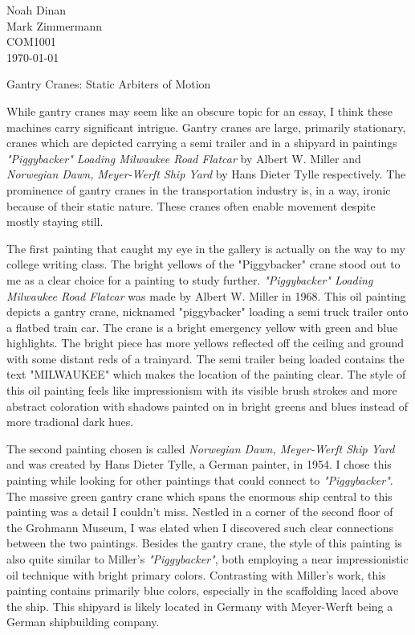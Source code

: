 \documentclass[12pt]{article}
\begin{document}
\noindent
Noah Dinan \\ Mark Zimmermann \\ COM1001 \\ \today \\

\begin{center}
Gantry Cranes: Static Arbiters of Motion
\end{center}

\setlength{\parindent}{0.5in}

While gantry cranes may seem like an obscure topic for an essay, I think these machines carry significant intrigue.
Gantry cranes are large, primarily stationary, cranes which are depicted carrying a semi trailer and in a shipyard
in paintings \textit{"Piggybacker" Loading Milwaukee Road Flatcar} by Albert W. Miller and \textit{Norwegian Dawn, Meyer-Werft Ship Yard} by 
Hans Dieter Tylle respectively. The prominence of gantry cranes in the transportation industry is, in a way, ironic because of their static nature.
These cranes often enable movement despite mostly staying still.

The first painting that caught my eye in the gallery is actually on the way to my college writing class. The bright yellows of the 
"Piggybacker" crane stood out to me as a clear choice for a painting to study further. \textit{"Piggybacker" Loading Milwaukee Road Flatcar}
was made by Albert W. Miller in 1968. This oil painting depicts a gantry crane, nicknamed "piggybacker" loading a semi truck trailer onto
a flatbed train car. The crane is a bright emergency yellow with green and blue highlights. The bright piece has more yellows reflected off the ceiling
and ground with some distant reds of a trainyard. The semi trailer being loaded contains the text "MILWAUKEE" which makes the location
of the painting clear. The style of this oil painting feels like impressionism with its visible brush strokes and more abstract coloration with shadows painted 
on in bright greens and blues instead of more tradional dark hues.

The second painting chosen is called \textit{Norwegian Dawn, Meyer-Werft Ship Yard} and was created by Hans Dieter Tylle, a German painter, in 1954.
I chose this painting while looking for other paintings that could connect to \textit{"Piggybacker"}. The massive green gantry crane which spans the enormous
ship central to this painting was a detail I couldn't miss. Nestled in a corner of the second floor of the Grohmann Museum, I was elated when I discovered
such clear connections between the two paintings. 
Besides the gantry crane, the style of this painting is also quite similar to Miller's \textit{"Piggybacker"}, both employing a 
near impressionistic oil technique with bright primary colors. Contrasting with Miller's work, this painting contains primarily blue colors, especially in
the scaffolding laced above the ship. This shipyard is likely located in Germany with Meyer-Werft being a German shipbuilding company.
\end{document}
